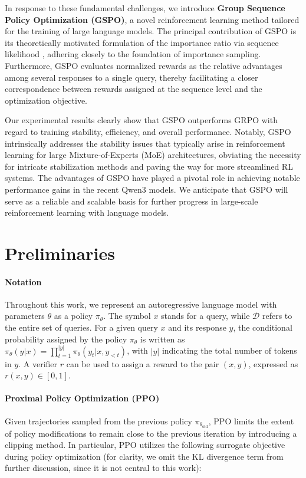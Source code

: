 In response to these fundamental challenges, we introduce \textbf{Group Sequence Policy Optimization (GSPO)}, a novel reinforcement learning method tailored for the training of large language models. The principal contribution of GSPO is its theoretically motivated formulation of the importance ratio via sequence likelihood \citep{click}, adhering closely to the foundation of importance sampling. Furthermore, GSPO evaluates normalized rewards as the relative advantages among several responses to a single query, thereby facilitating a closer correspondence between rewards assigned at the sequence level and the optimization objective.

Our experimental results clearly show that GSPO outperforms GRPO with regard to training stability, efficiency, and overall performance. Notably, GSPO intrinsically addresses the stability issues that typically arise in reinforcement learning for large Mixture-of-Experts (MoE) architectures, obviating the necessity for intricate stabilization methods and paving the way for more streamlined RL systems. The advantages of GSPO have played a pivotal role in achieving notable performance gains in the recent Qwen3 models. We anticipate that GSPO will serve as a reliable and scalable basis for further progress in large-scale reinforcement learning with language models.

\section{Preliminaries}

\paragraph{Notation}
Throughout this work, we represent an autoregressive language model with parameters $\theta$ as a policy $\pi_\theta$. The symbol $x$ stands for a query, while $\mathcal{D}$ refers to the entire set of queries. For a given query $x$ and its response $y$, the conditional probability assigned by the policy $\pi_\theta$ is written as $\pi_\theta (y | x) = \prod_{t=1}^{|y|} \pi_\theta (y_t | x, y_{<t} )$, with $|y|$ indicating the total number of tokens in $y$. A verifier $r$ can be used to assign a reward to the pair $(x, y)$, expressed as $r(x, y) \in [0, 1]$.

\paragraph{Proximal Policy Optimization (PPO)} Given trajectories sampled from the previous policy $\pi_{\theta_\text{old}}$, PPO \citep{ppo} limits the extent of policy modifications to remain close to the previous iteration by introducing a clipping method. In particular, PPO utilizes the following surrogate objective during policy optimization (for clarity, we omit the KL divergence term from further discussion, since it is not central to this work):


